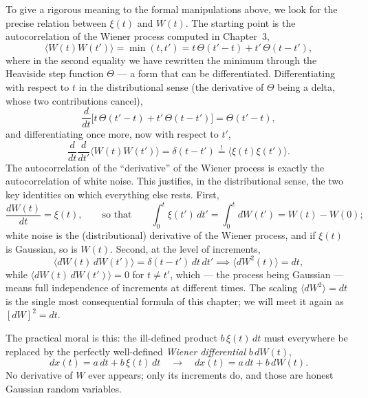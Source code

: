 To give a rigorous meaning to the formal manipulations above, we look for the precise relation between $\xi(t)$ and $W(t)$.
The starting point is the autocorrelation of the Wiener process computed in Chapter~3,
\begin{equation}
\langle W(t)W(t')\rangle = \min(t,t') = t\,\Theta(t'-t) + t'\,\Theta(t-t'),
\end{equation}
where in the second equality we have rewritten the minimum through the Heaviside step function $\Theta$ --- a form that can be differentiated.
Differentiating with respect to $t$ in the distributional sense (the derivative of $\Theta$ being a delta, whose two contributions cancel),
\begin{equation}
\frac{d}{dt}\big[t\,\Theta(t'-t) + t'\,\Theta(t-t')\big] = \Theta(t'-t),
\end{equation}
and differentiating once more, now with respect to $t'$,
\begin{equation}
\frac{d}{dt}\frac{d}{dt'}\langle W(t)W(t')\rangle = \delta(t-t') \overset{!}{=} \langle\xi(t)\xi(t')\rangle.
\end{equation}
The autocorrelation of the ``derivative'' of the Wiener process is exactly the autocorrelation of white noise.
This justifies, in the distributional sense, the two key identities on which everything else rests.
First,
\begin{equation}
\frac{dW(t)}{dt} = \xi(t),
\qquad\text{so that}\qquad
\int_0^t \xi(t')\,dt' = \int_0^t dW(t') = W(t)-W(0);
\end{equation}
white noise is the (distributional) derivative of the Wiener process, and if $\xi(t)$ is Gaussian, so is $W(t)$.
Second, at the level of increments,
\begin{equation}
\langle dW(t)\,dW(t')\rangle = \delta(t-t')\,dt\,dt' \implies \langle dW^2(t)\rangle = dt,
\end{equation}
while $\langle dW(t)\,dW(t')\rangle = 0$ for $t\ne t'$, which --- the process being Gaussian --- means full independence of increments at different times.
The scaling $\langle dW^2\rangle = dt$ is the single most consequential formula of this chapter; we will meet it again as $[dW]^2=dt$.

The practical moral is this: the ill-defined product $b\,\xi(t)\,dt$ must everywhere be replaced by the perfectly well-defined \emph{Wiener differential} $b\,dW(t)$,
\begin{equation}
dx(t) = a\,dt + b\,\xi(t)\,dt \quad\longrightarrow\quad dx(t) = a\,dt + b\,dW(t).
\end{equation}
No derivative of $W$ ever appears; only its increments do, and those are honest Gaussian random variables.


